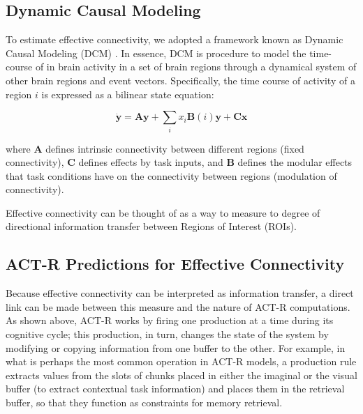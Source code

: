 \documentclass[10pt,letterpaper]{article}
\newcommand{\vct}[1]{\boldsymbol{#1}} %
\newcommand{\mat}[1]{\boldsymbol{#1}} %
\begin{document}
\subsection{Dynamic Causal Modeling}

To estimate effective connectivity, we adopted a framework known as Dynamic Causal Modeling (DCM) \cite{Friston2003, Stocco2018}. In essence, DCM is procedure to model the time-course of in brain activity in a set of brain regions through a dynamical system of other brain regions and event vectors. Specifically, the time course of activity of a region $i$ is expressed as a bilinear state equation:

\begin{equation}
\dot{\vct{y}} = \mat{A}\vct{y} + \sum_{i}x_i\mat{B}(i)\vct{y} + \mat{C}\vct{x}
\label{DCMEquation}
\end{equation}

where $\mat{A}$ defines intrinsic connectivity between different regions (fixed connectivity), $\mat{C}$ defines effects by task inputs, and $\mat{B}$ defines the modular effects that task conditions have on the connectivity between regions (modulation of connectivity). %

Effective connectivity can be thought of as a way to measure to degree of directional information transfer between Regions of Interest (ROIs).


\subsection{ACT-R Predictions for Effective Connectivity }

Because effective connectivity can be interpreted as information transfer, a direct link can be made between this measure and the nature of ACT-R computations. As shown above, ACT-R works by firing one production at a time during its cognitive cycle; this production, in turn, changes the state of the system by modifying or copying information from one buffer to the other. For example, in what is perhaps the most common operation in ACT-R models, a production rule extracts values from the slots of chunks placed in either the imaginal or the visual buffer (to extract contextual task information) and places them in the retrieval buffer, so that they function as constraints for memory retrieval.  
\end{document}
